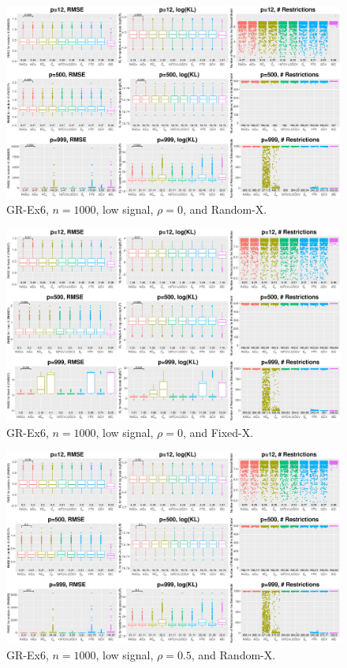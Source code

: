 \clearpage
\begin{figure}[!ht]
\centering
\includegraphics[width=\textwidth]{figures/supplement/randomx_GR-Ex6_n1000_lsnr_rho0.eps}
\caption{GR-Ex6, $n=1000$, low signal, $\rho=0$, and Random-X.}
\end{figure}
\begin{figure}[!ht]
\centering
\includegraphics[width=\textwidth]{figures/supplement/fixedx_GR-Ex6_n1000_lsnr_rho0.eps}
\caption{GR-Ex6, $n=1000$, low signal, $\rho=0$, and Fixed-X.}
\end{figure}
\clearpage
\begin{figure}[!ht]
\centering
\includegraphics[width=\textwidth]{figures/supplement/randomx_GR-Ex6_n1000_lsnr_rho05.eps}
\caption{GR-Ex6, $n=1000$, low signal, $\rho=0.5$, and Random-X.}
\end{figure}
